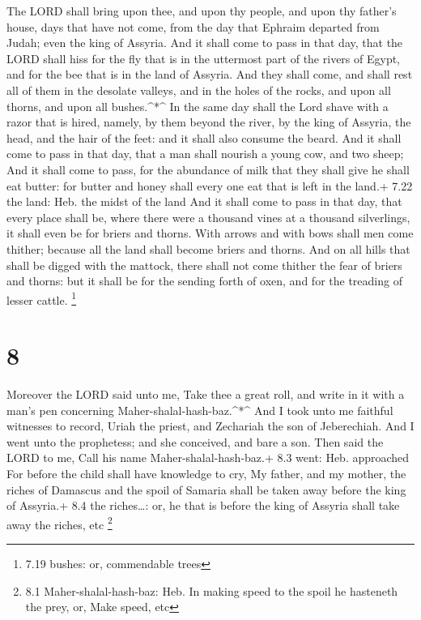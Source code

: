  The LORD shall bring upon thee, and upon thy people, and
upon thy father's house, days that have not come, from the day that
Ephraim departed from Judah; even the king of Assyria.  And
it shall come to pass in that day, that the LORD shall hiss for the fly
that is in the uttermost part of the rivers of Egypt, and for the bee
that is in the land of Assyria.  And they shall come, and
shall rest all of them in the desolate valleys, and in the holes of the
rocks, and upon all thorns, and upon all bushes.\^{}*\^{} 
In the same day shall the Lord shave with a razor that is hired, namely,
by them beyond the river, by the king of Assyria, the head, and the hair
of the feet: and it shall also consume the beard.  And it
shall come to pass in that day, that a man shall nourish a young cow,
and two sheep;  And it shall come to pass, for the
abundance of milk that they shall give he shall eat butter: for butter
and honey shall every one eat that is left in the land.+ 7.22 the land:
Heb. the midst of the land  And it shall come to pass in
that day, that every place shall be, where there were a thousand vines
at a thousand silverlings, it shall even be for briers and thorns.
 With arrows and with bows shall men come thither; because
all the land shall become briers and thorns.  And on all
hills that shall be digged with the mattock, there shall not come
thither the fear of briers and thorns: but it shall be for the sending
forth of oxen, and for the treading of lesser cattle. \footnote{7.19
  bushes: or, commendable trees}

\hypertarget{section-7}{%
\section{8}\label{section-7}}

 Moreover the LORD said unto me, Take thee a great roll, and
write in it with a man's pen concerning Maher-shalal-hash-baz.\^{}*\^{}
 And I took unto me faithful witnesses to record, Uriah the
priest, and Zechariah the son of Jeberechiah.  And I went
unto the prophetess; and she conceived, and bare a son. Then said the
LORD to me, Call his name Maher-shalal-hash-baz.+ 8.3 went: Heb.
approached  For before the child shall have knowledge to
cry, My father, and my mother, the riches of Damascus and the spoil of
Samaria shall be taken away before the king of Assyria.+ 8.4 the
riches\ldots: or, he that is before the king of Assyria shall take away
the riches, etc \footnote{8.1 Maher-shalal-hash-baz: Heb. In making
  speed to the spoil he hasteneth the prey, or, Make speed, etc}


